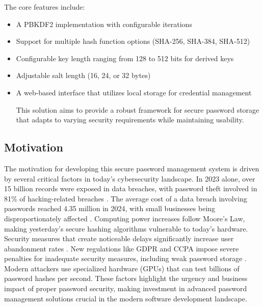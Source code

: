 \documentclass[11pt,a4paper]{article}
\begin{document}
            The core features include:
            \begin{itemize}
              \item A PBKDF2 implementation with configurable iterations
              \item Support for multiple hash function options (SHA-256, SHA-384, SHA-512)
              \item Configurable key length ranging from 128 to 512 bits for derived keys
              \item Adjustable salt length (16, 24, or 32 bytes)
              \item A web-based interface that utilizes local storage for credential management
              
              This solution aims to provide a robust framework for secure password storage that adapts to varying security requirements while maintaining usability. 
            \end{itemize}

            \subsection{Motivation}
            The motivation for developing this secure password management system is driven by several critical factors in today's cybersecurity landscape. In 2023 alone, over 15 billion records were exposed in data breaches, with password theft involved in 81\% of hacking-related breaches \cite{ibm2024databreach}. The average cost of a data breach involving passwords reached 4.35 million in 2024, with small businesses being disproportionately affected \cite{ibm2024databreach}. Computing power increases follow Moore's Law, making yesterday's secure hashing algorithms vulnerable to today's hardware. Security measures that create noticeable delays significantly increase user abandonment rates \cite{labrinidis2014challenges}. New regulations like GDPR and CCPA impose severe penalties for inadequate security measures, including weak password storage \cite{nielsen2014response} \cite{entrust2023privacy}. Modern attackers use specialized hardware (GPUs) that can test billions of password hashes per second. These factors highlight the urgency and business impact of proper password security, making investment in advanced password management solutions crucial in the modern software development landscape\cite{grassi2020digital}.
\end{document}
